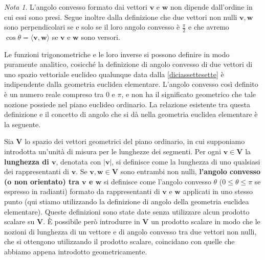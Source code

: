 \documentclass{article}
\theoremstyle{plain}
\theoremstyle{definition}
\theoremstyle{remark}
\newtheorem{note}{Nota}
\begin{document}
\vspace{10pt}

\begin{note}
L'angolo convesso formato dai vettori $\mathbf{v}$ e $\mathbf{w}$ non 
dipende dall'ordine in cui essi sono presi. Segue inoltre dalla definizione che due vettori non nulli 
$\mathbf{v}, \mathbf{w}$ sono perpendicolari se e solo se il loro angolo convesso è $\frac{\pi}{2}$ 
e che avremo $\cos \theta = \langle \mathbf{v}, \mathbf{w} \rangle$ se $\mathbf{v}$ e $\mathbf{w}$ sono versori.    
\end{note}

\vspace{10pt}

Le funzioni trigonometriche e le loro inverse si possono definire in modo puramente analitico, cosicché la definizione 
di angolo convesso di due vettori di uno spazio vettoriale euclideo qualunque data dalla \ref{diciassettesette} 
è indipendente dalla geometria euclidea elementare. L'angolo convesso così definito è un numero reale compreso 
tra $0$ e $\pi$, e non ha il significato geometrico che tale nozione possiede nel piano euclideo ordinario. 
La relazione esistente tra questa definizione e il concetto di angolo che si dà nella geometria euclidea elementare 
è la seguente.

\vspace{10pt}

Sia $\mathbf{V}$ lo spazio dei vettori geometrici del piano ordinario, in cui supponiamo introdotta un'unità 
di misura per le lunghezze dei segmenti. 
Per ogni $\mathbf{v} \in \mathbf{V}$ la \textbf{lunghezza di $\mathbf{v}$}, denotata con $|\mathbf{v}|$, 
si definisce come la lunghezza di uno qualsiasi dei rappresentanti di $\mathbf{v}$. Se $\mathbf{v}, \mathbf{w} \in \mathbf{V}$ 
sono entrambi non nulli, \textbf{l'angolo convesso (o non orientato) tra $\mathbf{v}$ e $\mathbf{w}$} si definisce come l'angolo 
convesso $\theta$ ($0 \leq \theta \leq \pi$ se espresso in radianti) formato da rappresentanti di $\mathbf{v}$ e $\mathbf{w}$ 
applicati in uno stesso punto (qui stiamo utilizzando la definizione di angolo della geometria euclidea elementare). 
Queste definizioni sono state date senza utilizzare alcun prodotto scalare su $\mathbf{V}$. È possibile però 
introdurre in $\mathbf{V}$ un prodotto scalare in modo che le nozioni di lunghezza di un vettore e di angolo convesso 
tra due vettori non nulli, che si ottengono utilizzando il prodotto scalare, coincidano con quelle che 
abbiamo appena introdotto geometricamente.
\end{document}
